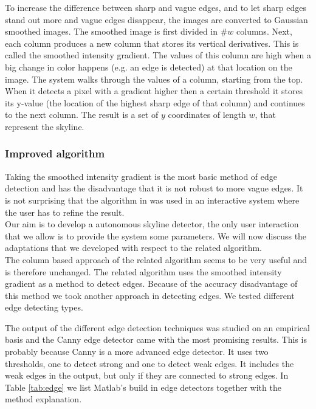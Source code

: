 To increase the difference between sharp and vague edges, and to let sharp edges
stand out more and vague edges disappear, the images are converted to Gaussian
smoothed images.  The smoothed image is first divided in \#$w$ columns.  Next,
each column produces a new column that stores its vertical derivatives. This is
called the smoothed intensity gradient.  The values of this column are high when
a big change in color happens (e.g. an edge is detected) at that location on the
image. 
The system walks through the values of a column, starting from the top.  When it
detects a pixel with a gradient higher then a certain threshold it stores its
y-value (the location of the highest sharp edge of that column) and continues
to the next column.  The result is a set of $y$ coordinates of length $w$, that
represent the skyline. 

\subsubsection{Improved algorithm}
Taking the smoothed intensity gradient is the most basic method of edge
detection and has the disadvantage that it is not robust to more vague edges. It
is not surprising that the algorithm in \cite{Rover}
was used in an interactive system where the user has to refine the result.\\

Our aim is to develop a autonomous skyline detector, the only user interaction
that we allow is to provide the system some parameters. We will now discuss
the adaptations that we developed with respect to the related algorithm.\\

The column based approach of the related algorithm seems to be very useful and is
therefore unchanged.  The related algorithm uses the smoothed intensity gradient
as a method to detect edges. 
Because of the accuracy disadvantage of this method we took another approach in
detecting edges. We tested different edge detecting types. 

The output of the different edge detection techniques was studied on an empirical
basis and the Canny edge detector came with the most promising results. This is
probably because Canny is a more advanced edge detector.  It uses two
thresholds, one to detect strong and one to detect weak edges. It includes the weak edges in the
output, but only if they are connected to strong edges. In Table \ref{tab:edge} %
we list Matlab's build in edge detectors together with the method explanation.

